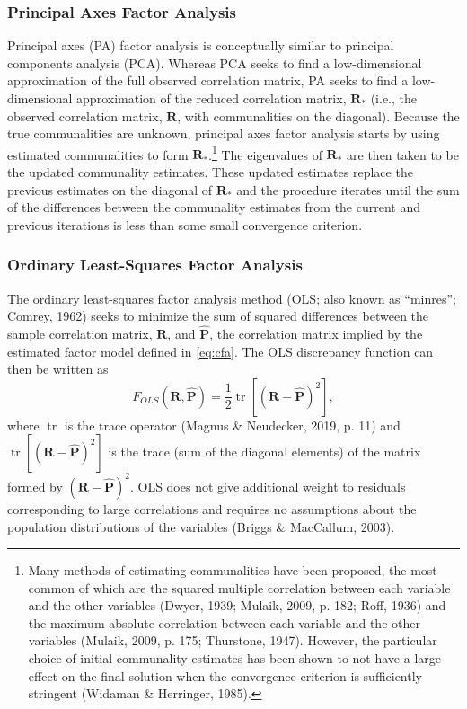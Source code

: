 \documentclass[
  english,
  man]{apa6}
\begin{document}
\hypertarget{principal-axes-factor-analysis}{%
\subsubsection{Principal Axes Factor Analysis}\label{principal-axes-factor-analysis}}

Principal axes (PA) factor analysis is conceptually similar to principal components analysis (PCA). Whereas PCA seeks to find a low-dimensional approximation of the full observed correlation matrix, PA seeks to find a low-dimensional approximation of the reduced correlation matrix, \(\mathbf{R}_*\) (i.e., the observed correlation matrix, \(\mathbf{R}\), with communalities on the diagonal). Because the true communalities are unknown, principal axes factor analysis starts by using estimated communalities to form \(\mathbf{R}_*\).\footnote{Many methods of estimating communalities have been proposed, the most common of which are the squared multiple correlation between each variable and the other variables (Dwyer, 1939; Mulaik, 2009, p. 182; Roff, 1936) and the maximum absolute correlation between each variable and the other variables (Mulaik, 2009, p. 175; Thurstone, 1947). However, the particular choice of initial communality estimates has been shown to not have a large effect on the final solution when the convergence criterion is sufficiently stringent (Widaman \& Herringer, 1985).} The eigenvalues of \(\mathbf{R}_*\) are then taken to be the updated communality estimates. These updated estimates replace the previous estimates on the diagonal of \(\textbf{R}_*\) and the procedure iterates until the sum of the differences between the communality estimates from the current and previous iterations is less than some small convergence criterion.

\hypertarget{ordinary-least-squares-factor-analysis}{%
\subsubsection{Ordinary Least-Squares Factor Analysis}\label{ordinary-least-squares-factor-analysis}}

The ordinary least-squares factor analysis method (OLS; also known as ``minres''; Comrey, 1962) seeks to minimize the sum of squared differences between the sample correlation matrix, \(\mathbf{R}\), and \(\hat{\mathbf{P}}\), the correlation matrix implied by the estimated factor model defined in \eqref{eq:cfa}. The OLS discrepancy function can then be written as
\begin{equation}
F_{OLS}(\mathbf{R}, \hat{\mathbf{P}}) = \frac{1}{2} \mathop{\mathrm{tr}}\left[ (\mathbf{R} - \hat{\mathbf{P}})^2 \right],
\label{eq:ls-discrepancy}
\end{equation}
where \(\mathop{\mathrm{tr}}\) is the trace operator (Magnus \& Neudecker, 2019, p. 11) and \(\mathop{\mathrm{tr}}\left[ (\mathbf{R} - \hat{\mathbf{P}})^2 \right]\) is the trace (sum of the diagonal elements) of the matrix formed by \((\mathbf{R} - \hat{\mathbf{P}})^2\). OLS does not give additional weight to residuals corresponding to large correlations and requires no assumptions about the population distributions of the variables (Briggs \& MacCallum, 2003).
\end{document}
